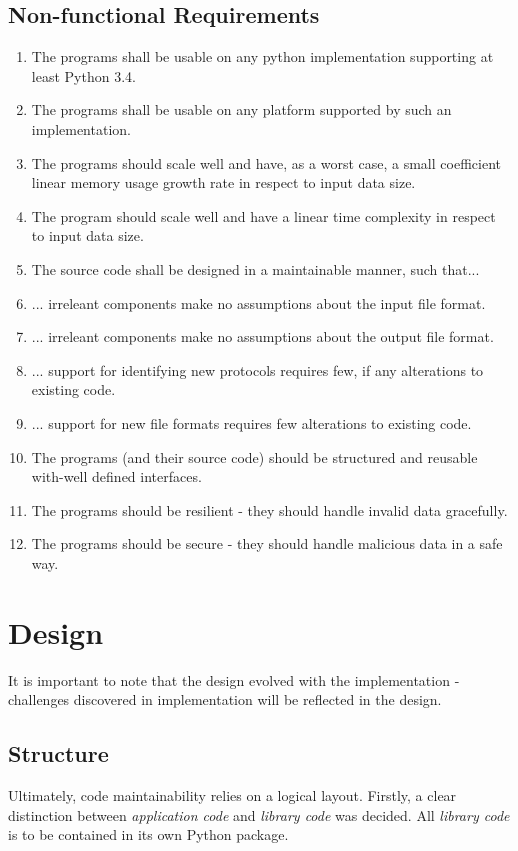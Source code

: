 \documentclass[10pt,a4paper,notitlepage]{report}
\begin{document}
\section{Non-functional Requirements}
\begin{enumerate}[label=\bfseries NFR\arabic*:]
\item \label{nfr:1} The programs shall be usable on any python implementation supporting at least Python 3.4.
\item \label{nfr:2} The programs shall be usable on any platform supported by such an implementation.
\item \label{nfr:3} The programs should scale well and have, as a worst case, a small coefficient linear memory usage growth rate in respect to input data size.
\item \label{nfr:4} The program should scale well and have a linear time complexity in respect to input data size.
\item \label{nfr:5} The source code shall be designed in a maintainable manner, such that...
\item \label{nfr:6} ... irreleant components make no assumptions about the input file format.
\item \label{nfr:7} ... irreleant components make no assumptions about the output file format.
\item \label{nfr:8} ... support for identifying new protocols requires few, if any alterations to existing code.
\item \label{nfr:9} ... support for new file formats requires few alterations to existing code.
\item \label{nfr:10} The programs (and their source code) should be structured and reusable with-well defined interfaces.
\item \label{nfr:11} The programs should be resilient - they should handle invalid data gracefully.
\item \label{nfr:12} The programs should be secure - they should handle malicious data in a safe way.
\end{enumerate}

\chapter{Design}
It is important to note that the design evolved with the implementation - challenges discovered in implementation will be reflected in the design.


\section{Structure}
Ultimately, code maintainability relies on a logical layout. Firstly, a clear distinction between \emph{application code} and \emph{library code} was decided. All \emph{library code} is to be contained in its own Python package.
\end{document}
